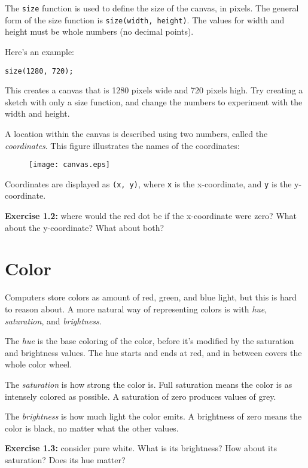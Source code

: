\documentclass[
]{leaflet}
\begin{document}
The \texttt{size} function is used to define the size of the canvas, in pixels.
The general form of the size function is \texttt{size(width, height)}.
The values for width and height must be whole numbers (no decimal points).

Here's an example:

\begin{lstlisting}
size(1280, 720);
\end{lstlisting}

This creates a canvas that is 1280 pixels wide and 720 pixels high.
Try creating a sketch with only a size function, and change the numbers to experiment with the width and height.

A location within the canvas is described using two numbers, called the \textit{coordinates}.
This figure illustrates the names of the coordinates:

\begin{figure}[!h]
  \centering
  \texttt{[image: canvas.eps]}
\end{figure}

Coordinates are displayed as \texttt{(x, y)}, where \texttt{x} is the x-coordinate, and \texttt{y} is the y-coordinate.

\textbf{Exercise 1.2:} where would the red dot be if the x-coordinate were zero?
What about the y-coordinate?
What about both?

\section{Color}

Computers store colors as amount of red, green, and blue light, but this is hard to reason about.
A more natural way of representing colors is with \textit{hue}, \textit{saturation}, and \textit{brightness}.

The \textit{hue} is the base coloring of the color, before it's modified by the saturation and brightness values.
The hue starts and ends at red, and in between covers the whole color wheel.

The \textit{saturation} is how strong the color is.
Full saturation means the color is as intensely colored as possible.
A saturation of zero produces values of grey.

The \textit{brightness} is how much light the color emits.
A brightness of zero means the color is black, no matter what the other values.

\textbf{Exercise 1.3:} consider pure white. What is its brightness? How about its saturation? Does its hue matter?
\end{document}

